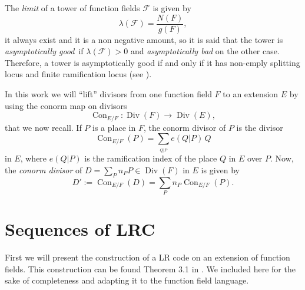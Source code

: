 \documentclass{amsart}
\newcommand{\m}{\mathcal}
\newcommand{\divisor}{\operatorname{Div}}
\newcommand{\con}{\operatorname{Con}}
\theoremstyle{definition}
\begin{document}
The \emph{limit} of a tower of function fields $\m{F}$ is given  by $$\lambda(\m{F})=\frac{N(F)}{g(F)},$$ it always exist and it is a non negative amount, so it is said that the tower is \emph{asymptotically good} if $\lambda(\m{F})>0$ and \emph{asymptotically bad} on the other case. Therefore, a tower is asymptotically good if and only if it has non-emply splitting locus and finite ramification locus (see \cite[Proposition 7.2.6]{stichtenoth}). 


In this work we will ``lift'' divisors from one function field $F$ to an extension $E$ by using the conorm map on divisors 
$$\con_{E/F} : \divisor(F) \rightarrow \divisor(E),$$ 
that we now recall.  
If $P$ is a place in $F$, the conorm divisor of $P$ is the divisor 
$$\con_{E/F}(P) = \sum_{_{Q|P}} e(Q|P) \,Q$$ 
in $E$, where $e(Q|P)$ is the ramification index of the place $Q$ in $E$ over $P$. 
Now, the \textit{conorm divisor} of $D=\sum_P n_P P \in \divisor(F)$ in $E$ is given by
\begin{equation*} \label{conorm}
D':= \con_{E/F} (D) = \sum_P n_P \con_{E/F}(P). 
\end{equation*}


\section{Sequences of LRC}\label{Primera}

First we will present the construction of a LR code on an extension of function fields. This construction can be found Theorem 3.1 in \cite{BargTamoVladut}. We included here for the sake of completeness and adapting it to the function field language.  
\end{document}

